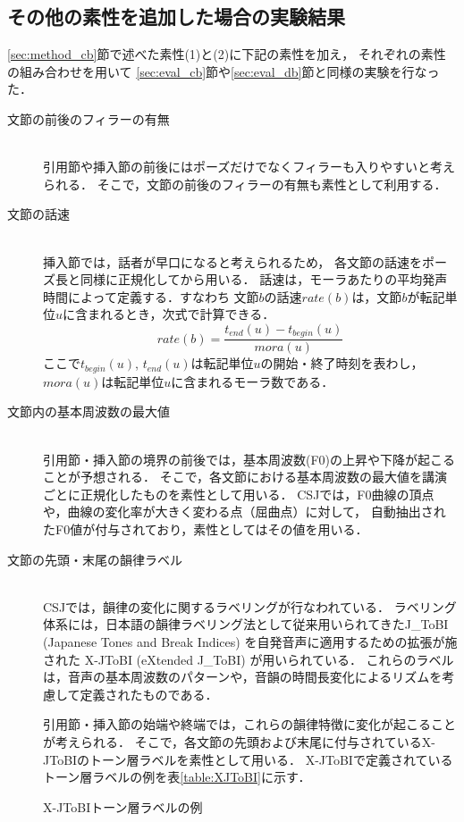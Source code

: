\documentclass[japanese]{jnlp_1.4}
\begin{document}
\subsection{その他の素性を追加した場合の実験結果}\label{sec:additional_features}

\ref{sec:method_cb}節で述べた素性(1)と(2)に下記の素性を加え，
それぞれの素性の組み合わせを用いて
\ref{sec:eval_cb}節や\ref{sec:eval_db}節と同様の実験を行なった．

\begin{description}
\item[文節の前後のフィラーの有無]　　\\
引用節や挿入節の前後にはポーズだけでなくフィラーも入りやすいと考えられる．
そこで，文節の前後のフィラーの有無も素性として利用する．

\item[文節の話速]　　\\
挿入節では，話者が早口になると考えられるため，
各文節の話速をポーズ長と同様に正規化してから用いる．
話速は，モーラあたりの平均発声時間によって定義する．すなわち
文節$b$の話速$rate(b)$は，文節$b$が転記単位$u$に含まれるとき，次式で計算できる．
\[
rate(b) = \frac{t_{end}(u) - t_{begin}(u)}{mora(u)} 
\]
ここで$t_{begin}(u)$, $t_{end}(u)$は転記単位$u$の開始・終了時刻を表わし，
$mora(u)$は転記単位$u$に含まれるモーラ数である．

\item[文節内の基本周波数の最大値]　　\\
引用節・挿入節の境界の前後では，基本周波数(F0)の上昇や下降が起こることが予想される．
そこで，各文節における基本周波数の最大値を講演ごとに正規化したものを素性として用いる．
CSJでは，F0曲線の頂点や，曲線の変化率が大きく変わる点（屈曲点）に対して，
自動抽出されたF0値が付与されており，素性としてはその値を用いる．

\item[文節の先頭・末尾の韻律ラベル]　　\\
CSJでは，韻律の変化に関するラベリングが行なわれている．
ラベリング体系には，日本語の韻律ラベリング法として従来用いられてきたJ\_ToBI
(Japanese Tones and Break Indices) \cite{JToBI}を自発音声に適用するための拡張が施された
X-JToBI (eXtended J\_ToBI) \cite{X-JToBI}が用いられている．
これらのラベルは，音声の基本周波数のパターンや，音韻の時間長変化によるリズムを考慮して定義されたものである．

引用節・挿入節の始端や終端では，これらの韻律特徴に変化が起こることが考えられる．
そこで，各文節の先頭および末尾に付与されているX-JToBIのトーン層ラベルを素性として用いる．
X-JToBIで定義されているトーン層ラベルの例を表\ref{table:XJToBI}に示す．

\begin{table}[b]
\caption{X-JToBIトーン層ラベルの例}
\label{table:XJToBI}
\begin{center}

\end{center}
\end{table}

\end{description}
\end{document}
